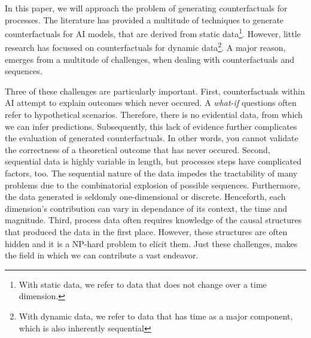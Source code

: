 \documentclass[./../../paper.tex]{subfiles}
\begin{document}
In this paper, we will approach the problem of generating counterfactuals for processes. The literature has provided a multitude of techniques to generate counterfactuals for AI models, that are derived from static data\footnote{With static data, we refer to data that does not change over a time dimension.}. However, little research has focussed on counterfactuals for dynamic data\footnote{With dynamic data, we refer to data that has time as a major component, which is also inherently sequential}. A major reason, emerges from a multitude of challenges, when dealing with counterfactuals and sequences. 

Three of these challenges are particularly important. First, counterfactuals within AI attempt to explain outcomes which never occured. A \emph{what-if} questions often refer to hypothetical scenarios. Therefore, there is no evidential data, from which we can infer predictions. Subsequently, this lack of evidence further complicates the evaluation of generated counterfactuals. In other words, you cannot validate the correctness of a theoretical outcome that has never occured.
Second, sequential data is highly variable in length, but processes steps have complicated factors, too\needscite. The sequential nature of the data impedes the tractability of many problems due to the combinatorial explosion of possible sequences. Furthermore, the data generated is seldomly one-dimensional or discrete. Henceforth, each dimension's contribution can vary in dependance of its context, the time and magnitude.
Third, process data often requires knowledge of the causal structures that produced the data in the first place. However, these structures are often hidden and it is a NP-hard problem to elicit them. 
Just these challenges, makes the field in which we can contribute a vast endeavor. 
\end{document}
